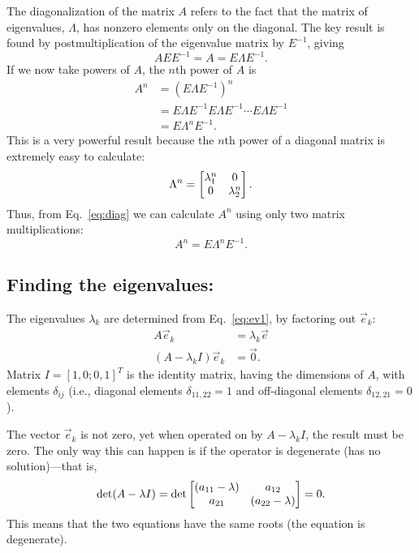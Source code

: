 \documentclass{ximera}
\begin{document}
The diagonalization of the matrix $A$ refers to the fact that the matrix of eigenvalues, $\Lambda$,
has nonzero elements only on the diagonal. The key result is found by  postmultiplication of the
eigenvalue matrix by $E^{-1}$, giving
\begin{equation}
AE E^{-1}= A= E\Lambda E^{-1}.
\end{equation}
If we now take powers of $A$, the $n$th power of $A$ is
\begin{align}
A^n&=(E\Lambda E^{-1})^n  \nonumber\\
&= E\Lambda E^{-1}E\Lambda E^{-1}\cdots E\Lambda E^{-1} \nonumber \\
&= E\Lambda^n E^{-1}.
 \label{eq:diag}
\end{align}
This is a very powerful result because the $n$th power of a diagonal matrix is extremely
easy to calculate:
\[\Lambda^n =
\begin{bmatrix}
\lambda_1^n & 0 \\
0 & \lambda_2^n 
\end{bmatrix}.
\]
Thus, from Eq.~\ref{eq:diag} we can calculate $A^n$ using only two matrix multiplications:
\[
A^n = E\Lambda^n E^{-1}.
\]


\subsection{Finding the eigenvalues:}
The eigenvalues $\lambda_k$ are determined from Eq.~\ref{eq:ev1}, by factoring out $\vec{e}_k$:
\begin{align*}
A\vec{e}_k &= \lambda_k \vec{e} \\
(A-\lambda_k I)\vec{e}_k &=\vec{0}.
\end{align*}
Matrix $I = [1,0;0,1]^T$ is the identity matrix, having the dimensions of $A$, with elements
$\delta_{ij}$ (i.e., diagonal elements $\delta_{11,22}=1$ and off-diagonal elements $\delta_{12,21}= 0$).

The vector $\vec{e}_k$ is not zero, yet when operated on by $A-\lambda_kI$, the result must be zero.
The only way this can happen is if the operator is degenerate (has no solution)---that is, 
\begin{equation}
\text{det}(A-\lambda I) = \text{det} 
\begin{bmatrix}
(a_{11}-\lambda) & a_{12} \\
a_{21} & (a_{22}-\lambda)
\end{bmatrix}
= 0 .
\end{equation}
This means that the two equations have the same roots (the equation is degenerate).
\end{document}
